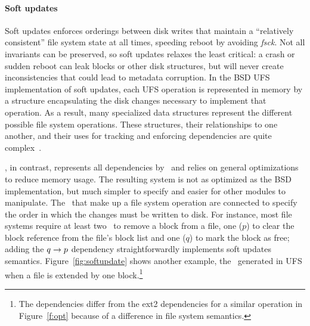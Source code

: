 
\paragraph{Soft updates}
\label{sec:using:softupdate}

%
Soft updates enforces orderings between disk writes that maintain
a ``relatively consistent'' file system state at all times, speeding
reboot by avoiding \emph{fsck}.
%
Not all invariants can be preserved, so soft updates relaxes the least
critical: a crash or sudden reboot can leak blocks or other disk
structures, but will never create inconsistencies that could lead to
metadata corruption.
%
%
%
In the BSD UFS implementation of soft updates, each UFS operation is
represented in memory by a structure encapsulating the disk changes
necessary to implement that operation. As a result, many
specialized data structures represent the different possible file system
operations. These structures, their relationships to one another, and their uses
for tracking and enforcing dependencies are quite
complex~\cite{mckusick99soft}.

\Kudos, in contrast, represents all dependencies by \patches\ and relies on
general optimizations to reduce memory usage.
%
The resulting system is not as optimized as the BSD implementation, but
much simpler to specify and easier for other modules to manipulate.
%
The \patches\ that make up a file system operation are connected to specify
the order in which the changes must be written to disk.
%
For instance, most file systems require at least two \patches\ to remove
a block from a file, one ($p$) to clear the block reference from the file's
block list and one ($q$) to mark the block as free; adding the $q \rightarrow
p$ dependency straightforwardly implements soft updates semantics.
%
Figure~\ref{fig:softupdate} shows another example, the \patches\ generated in
UFS when a file is extended by one block.\footnote{The dependencies differ
from the ext2 dependencies for a similar operation in Figure~\ref{f:opt}
because of a difference in file system semantics.}

